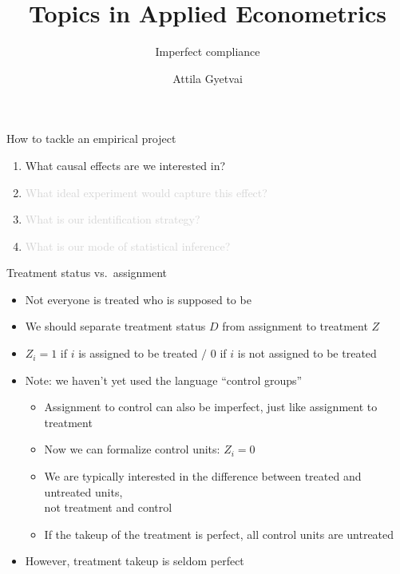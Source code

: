 \documentclass[aspectratio=169,compress,handout,t,xcolor=table]{beamer}
\title{Topics in Applied Econometrics}
\subtitle[]{Imperfect compliance}
\author[Attila Gyetvai]{Attila Gyetvai}
\institute[]{Duke Economics \\ Summer 2020}
\date{}
\begin{document}
{
\begin{frame}
  \titlepage
\end{frame}
}
\addtocounter{framenumber}{-1}

\begin{frame}[c]{How to tackle an empirical project}
  \begin{enumerate}
    \addtolength{\itemsep}{0.5\baselineskip}
    \item What causal effects are we interested in?
    \item \textcolor{lightgray}{What ideal experiment would capture this effect?}
    \item \textcolor{lightgray}{What is our identification strategy?}
    \item \textcolor{lightgray}{What is our mode of statistical inference?}
  \end{enumerate}
\end{frame}

\begin{frame}{Treatment status vs.\ assignment}
  \begin{itemize}
    \item Not everyone is treated who is supposed to be
    \item We should separate treatment status \(D\) from assignment to treatment \(Z\)
    \item \(Z_i = 1\) if \(i\) is assigned to be treated \(\big/\) 0 if \(i\) is not assigned to be treated
    \item Note: we haven't yet used the language ``control groups''
    \begin{itemize}
      \item Assignment to control can also be imperfect, just like assignment to treatment
      \item Now we can formalize control units: \(Z_i=0\)
      \item We are typically interested in the difference between treated and untreated units, \\ not treatment and control
      \item If the takeup of the treatment is perfect, all control units are untreated
    \end{itemize}
    \item However, treatment takeup is seldom perfect
  \end{itemize}
\end{frame}
\end{document}
